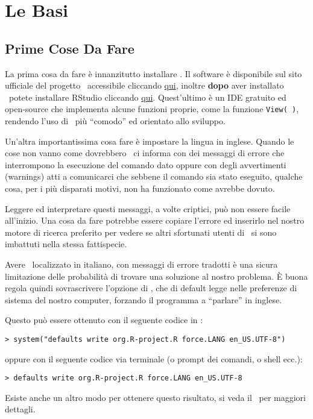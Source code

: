 \chapter{Le Basi}
\section{Prime Cose Da Fare}
La prima cosa da fare è innanzitutto installare \erre. Il software è disponibile sul sito ufficiale del progetto \erre\ accessibile cliccando \href{http://www.r-project.org}{qui}, inoltre \textbf{dopo} aver installato \erre\ potete installare \textsf{RStudio} cliccando \href{http://www.rstudio.com}{qui}. Quest'ultimo è un \textsf{IDE} gratuito ed open-source che implementa alcune funzioni proprie, come la funzione \lstinline!View( )!, rendendo l'uso di \erre\ più ``comodo'' ed orientato allo sviluppo.

Un'altra importantissima cosa fare è impostare la lingua in inglese.
Quando le cose non vanno come dovrebbero \erre\ ci informa con dei messaggi di errore che interrompono la esecuzione del comando dato oppure con degli avvertimenti (warnings) atti a comunicarci che sebbene il comando sia stato eseguito, qualche cosa, per i più disparati motivi, non ha funzionato come avrebbe dovuto.

Leggere ed interpretare questi messaggi, a volte criptici, può non essere facile all'inizio. Una cosa da fare potrebbe essere copiare l'errore ed inserirlo nel nostro motore di ricerca preferito per vedere se altri sfortunati utenti di \erre\ si sono imbattuti nella stessa fattispecie.

Avere \erre\ localizzato in italiano, con messaggi di errore tradotti è una sicura limitazione delle probabilità di trovare una soluzione al nostro problema. È buona regola quindi sovrascrivere l'opzione di \erre, che di default legge nelle preferenze di sistema del nostro computer, forzando il programma a ``parlare'' in inglese.

Questo può essere ottenuto con il seguente codice in \erre:
\begin{lstlisting}
> system("defaults write org.R-project.R force.LANG en_US.UTF-8")
\end{lstlisting}
oppure con il seguente codice via terminale (o prompt dei comandi, o shell ecc.):
\begin{lstlisting}
> defaults write org.R-project.R force.LANG en_US.UTF-8
\end{lstlisting}

Esiste anche un altro modo per ottenere questo risultato, si veda il~\cite{core:inst} per maggiori dettagli.

